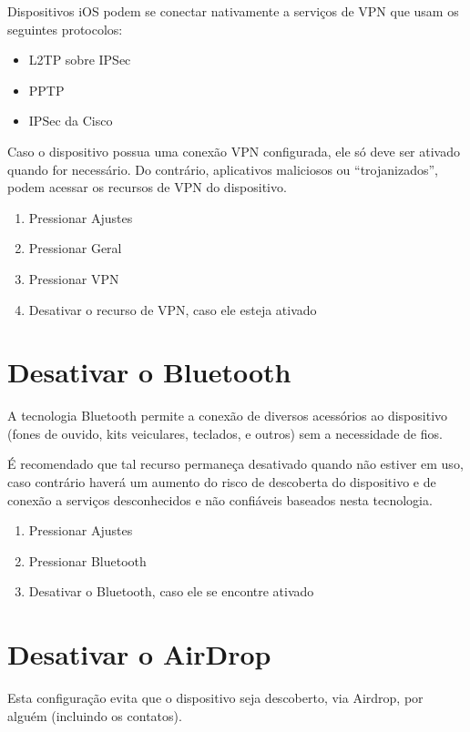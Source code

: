 Dispositivos iOS podem se conectar nativamente a servi\c cos de VPN que usam os seguintes protocolos:

\begin{itemize}
\item L2TP sobre IPSec
\item PPTP
\item IPSec da Cisco
\end{itemize}

Caso o dispositivo possua uma conex\~ao VPN configurada, ele s\'o deve ser ativado quando for necess\'ario. Do contr\'ario, aplicativos maliciosos ou ``trojanizados'', podem acessar os recursos de VPN do dispositivo.

\begin{enumerate}
\item Pressionar Ajustes
\item Pressionar Geral
\item Pressionar VPN
\item Desativar o recurso de VPN, caso ele esteja ativado
\end{enumerate}

\section{Desativar o Bluetooth}

A tecnologia Bluetooth permite a conex\~ao de diversos acess\'orios ao dispositivo (fones de ouvido, kits veiculares, teclados, e outros) sem a necessidade de fios. 

\'E recomendado que tal recurso permane\c ca desativado quando n\~ao estiver em uso, caso contr\'ario haver\'a um aumento do risco de descoberta do dispositivo e de conex\~ao a servi\c cos desconhecidos e n\~ao confi\'aveis baseados nesta tecnologia.

\begin{enumerate}
\item Pressionar Ajustes
\item Pressionar Bluetooth
\item Desativar o Bluetooth, caso ele se encontre ativado
\end{enumerate}

\section{Desativar o AirDrop}

Esta configura\c c\~ao evita que o dispositivo seja descoberto, via Airdrop, por algu\'em (incluindo os contatos). 

